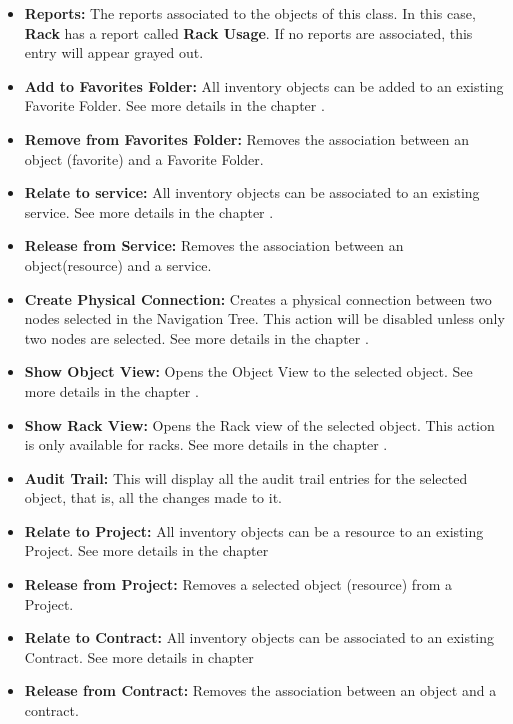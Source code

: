 \documentclass[a4paper]{article}
\begin{document}
\begin{itemize}
		\item \textbf{Reports:} The reports associated to the objects of this class. In this case, \textbf{Rack} has a report called \textbf{Rack Usage}. If no reports are associated, this entry will appear grayed out.
		\item \textbf{Add to Favorites Folder:} All inventory objects can be added to an existing Favorite Folder. See more details in the chapter \textbf{}.
		\item \textbf{Remove from Favorites Folder:} Removes the association between an object (favorite) and a Favorite Folder.
		\item \textbf{Relate to service:} All inventory objects can be associated to an existing service. See more details in the chapter \textbf{}.
		\item \textbf{Release from Service:} Removes the association between an object(resource) and a service.
		\item \textbf{Create Physical Connection:} Creates a physical connection between two nodes selected in the Navigation Tree. This action will be disabled unless only two nodes are selected. See more details in the chapter \textbf{}.
		\item \textbf{Show Object View:} Opens the Object View to the selected object. See more details in the chapter \textbf{}.
		\item \textbf{Show Rack View:} Opens the Rack view of the selected object. This action is only available for racks. See more details in the chapter \textbf{}.
		\item \textbf{Audit Trail:} This will display all the audit trail entries for the selected object, that is, all the changes made to it.
		\item \textbf{Relate to Project:} All inventory objects can be a resource to an existing Project. See more details in the chapter \textbf{}
		\item \textbf{Release from Project:} Removes a selected object (resource) from a Project.
		\item \textbf{Relate to Contract:} All inventory objects can be associated to an existing Contract. See more details in chapter \textbf{}
		\item \textbf{Release from Contract:} Removes the association between an object and a contract.

\end{itemize}
\end{document}
